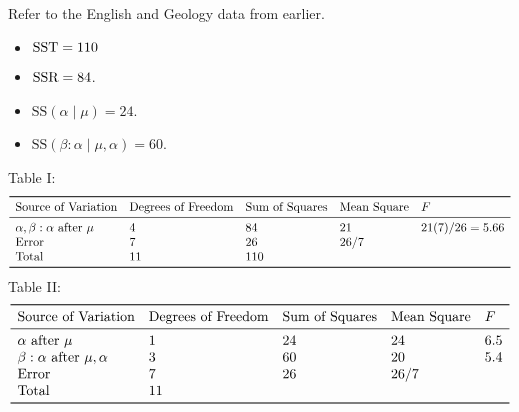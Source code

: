 \begin{Example}{}{}
    Refer to the English and Geology data from earlier.
    \begin{itemize}
        \item $ \text{SST}=110 $
        \item $ \text{SSR}=84 $.
        \item $ \text{SS}(\alpha\mid \mu)=24 $.
        \item $ \text{SS}(\beta:\alpha\mid \mu,\alpha)=60 $.
    \end{itemize}
    Table I\@:
    \[ \begin{array}{lllll}
            \toprule
            \text{Source of Variation}           & \text{Degrees of Freedom} & \text{Sum of Squares} & \text{Mean Square} & F             \\
            \midrule
            \alpha,\beta:\alpha\text{ after }\mu & 4                         & 84                    & 21                 & 21(7)/26=5.66 \\
            \text{Error}                         & 7                         & 26                    & 26/7                               \\
            \text{Total}                         & 11                        & 110                                                        \\
            \bottomrule
        \end{array} \]
    Table II\@:
    \[ \begin{array}{lllll}
            \toprule
            \text{Source of Variation}           & \text{Degrees of Freedom} & \text{Sum of Squares} & \text{Mean Square} & F   \\
            \midrule
            \alpha\text{ after }\mu              & 1                         & 24                    & 24                 & 6.5 \\
            \beta:\alpha\text{ after }\mu,\alpha & 3                         & 60                    & 20                 & 5.4 \\
            \text{Error}                         & 7                         & 26                    & 26/7                     \\
            \text{Total}                         & 11                                                                           \\
            \bottomrule
        \end{array} \]
    \begin{itemize}

\end{itemize}
\end{Example}
